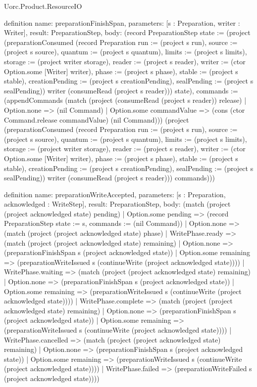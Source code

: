 \begin{lexlean}{Uorc.Product.ResourceIO}
\begin{semanticmodule}
definition{
  name: preparationFinishSpan,
  parameters: [s : Preparation, writer : Writer],
  result: PreparationStep,
  body: (record PreparationStep {state := (project (preparationConsumed (record Preparation {run := (project s run), source := (project s source), quantum := (project s quantum), limits := (project s limits), storage := (project writer storage), reader := (project s reader), writer := (ctor Option.some [Writer] writer), phase := (project s phase), stable := (project s stable), creationPending := (project s creationPending), sealPending := (project s sealPending)}) writer (consumeRead (project s reader))) state), commands := (appendCommands (match (project (consumeRead (project s reader)) release)
    | Option.none => (nil Command)
    | Option.some commandValue => (cons (ctor Command.release commandValue) (nil Command))) (project (preparationConsumed (record Preparation {run := (project s run), source := (project s source), quantum := (project s quantum), limits := (project s limits), storage := (project writer storage), reader := (project s reader), writer := (ctor Option.some [Writer] writer), phase := (project s phase), stable := (project s stable), creationPending := (project s creationPending), sealPending := (project s sealPending)}) writer (consumeRead (project s reader))) commands))})
}

definition{
  name: preparationWriteAccepted,
  parameters: [s : Preparation, acknowledged : WriteStep],
  result: PreparationStep,
  body: (match (project (project acknowledged state) pending)
    | Option.some pending => (record PreparationStep {state := s, commands := (nil Command)})
    | Option.none => (match (project (project acknowledged state) phase)
      | WritePhase.ready => (match (project (project acknowledged state) remaining)
        | Option.none => (preparationFinishSpan s (project acknowledged state))
        | Option.some remaining => (preparationWriteIssued s (continueWrite (project acknowledged state))))
      | WritePhase.waiting => (match (project (project acknowledged state) remaining)
        | Option.none => (preparationFinishSpan s (project acknowledged state))
        | Option.some remaining => (preparationWriteIssued s (continueWrite (project acknowledged state))))
      | WritePhase.complete => (match (project (project acknowledged state) remaining)
        | Option.none => (preparationFinishSpan s (project acknowledged state))
        | Option.some remaining => (preparationWriteIssued s (continueWrite (project acknowledged state))))
      | WritePhase.cancelled => (match (project (project acknowledged state) remaining)
        | Option.none => (preparationFinishSpan s (project acknowledged state))
        | Option.some remaining => (preparationWriteIssued s (continueWrite (project acknowledged state))))
      | WritePhase.failed => (preparationWriteFailed s (project acknowledged state))))
}


\end{semanticmodule}
\end{lexlean}
